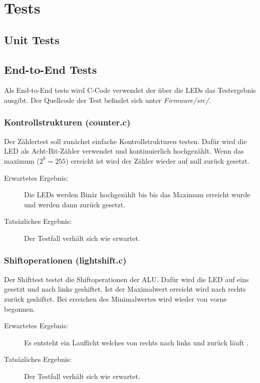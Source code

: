 \chapter{Tests}

    \section{Unit Tests}

    \section{End-to-End Tests}
        Als End-to-End tests wird C-Code verwendet der über die LEDs das Testergebnis
        ausgibt. Der Quellcode der Test befindet sich unter \textit{Firmware/src/}.

        \subsection{Kontrollstrukturen (counter.c)}\label{lab:counter-test}
            Der Zählertest soll zunächst einfache Kontrollstrukturen testen.
            Dafür wird die LED als Acht-Bit-Zähler verwendet und kontinuierlich hochgezählt.
            Wenn das maximum ($2^8 = 255$) erreicht ist wird der Zähler wieder auf null zurück gesetzt.

            \begin{description}
                \item[Erwartetes Ergebnis:] Die LEDs werden Binär hochgezählt bis
                bis das Maximum erreicht wurde und werden dann zurück gesetzt.
                \item[Tatsäzliches Ergebnis:] Der Testfall verhält sich wie erwartet.
            \end{description}
            
        
        \subsection{Shiftoperationen (lightshift.c)}\label{lab:lightshift-test}
            Der Shifttest testet die Shiftoperationen der ALU.
            Dafür wird die LED auf eins gesetzt und nach links geshiftet.
            Ist der Maximalwert erreicht wird nach rechts zurück geshiftet.
            Bei erreichen des Minimalwertes wird wieder von vorne begonnen.

            \begin{description}
                \item[Erwartetes Ergebnis:] Es entsteht ein Lauflicht welches von
                rechts nach links und zurück läuft .
                \item[Tatsäzliches Ergebnis:] Der Testfall verhält sich wie erwartet.
            \end{description}

